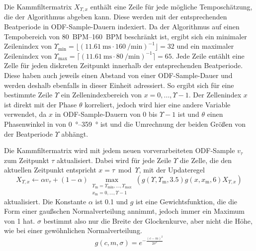 {{{			%
			Die Kammfiltermatrix $X_{\Upsilon, x}$ enthält eine Zeile für jede mögliche Temposchätzung, die der Algorithmus abgeben kann.
			Diese werden mit der entsprechenden Beatperiode in ODF-Sample-Dauern indexiert.
			Da der Algorithmus auf einen Tempobereich von \SIrange{80}{160}{BPM} beschränkt ist,
				ergibt sich ein minimaler Zeilenindex von
				$\Upsilon_{\text{min}} = \lfloor(\SI{11.61}{\milli\second} \cdot \SI{160}{\per\minute})^{-1}\rfloor = 32$
				und ein maximaler Zeilenindex von
				$\Upsilon_{\text{max}} = \lceil(\SI{11.61}{\milli\second} \cdot \SI{80}{\per\minute})^{-1}\rceil = 65$.
			Jede Zeile entählt eine Zelle für jeden diskreten Zeitpunkt innerhalb der entsprechenden Beatperiode.
			Diese haben auch jeweils einen Abstand von einer ODF-Sample-Dauer
				und werden deshalb ebenfalls in dieser Einheit adressiert.
			So ergibt sich für eine bestimmte Zeile $\Upsilon$ ein Zellenindexbereich von $x = 0, ..., \Upsilon - 1$.
			Der Zellenindex $x$ ist direkt mit der Phase $\theta$ korreliert,
				jedoch wird hier eine andere Variable verwendet,
				da $x$ in ODF-Sample-Dauern von $0$ bis $\Upsilon - 1$ ist
				und $\theta$ einen Phasenwinkel in von \SIrange{0}{359}{\degree} ist
				und die Umrechnung der beiden Grö{\ss}en von der Beatperiode $\Upsilon$ abhängt.

			Die Kammfiltermatrix wird mit jedem neuen vorverarbeiteten ODF-Sample $v_\tau$ zum Zeitpunkt $\tau$ aktualisiert.
			Dabei wird für jede Zeile $\Upsilon$ die Zelle,
				die den aktuellen Zeitpunkt entspricht $x = \tau \bmod \Upsilon$,
				mit der Updateregel
				\begin{equation}
					X_{\Upsilon, x} \leftarrow
						\alpha v_\tau +
						(1 - \alpha) \max_{
							\substack{
								\Upsilon_\text{m} = \Upsilon_{\text{min}}, ..., \Upsilon_{\text{max}} \\
								x_\text{m} = 0, ..., \Upsilon - 1
							}
						}
						(g(\Upsilon, \Upsilon_\text{m}, 3.5) g(x, x_\text{m}, 6) X_{\Upsilon, x})
				\end{equation}
				aktualisiert.
			Die Konstante $\alpha$ ist \num{0.1}
				und $g$ ist eine Gewichtsfunktion,
				die die Form einer gau{\ss}schen Normalverteilung annimmt,
				jedoch immer ein Maximum von \num{1} hat.
			$\sigma$ bestimmt also nur die Breite der Glockenkurve,
				aber nicht die Höhe,
				wie bei einer gewöhnlichen Normalverteilung.
			\begin{equation}
				g(c, m, \sigma) = e^{-\frac{(c - m)^2}{2\sigma^2}}
			\end{equation}

}}}
